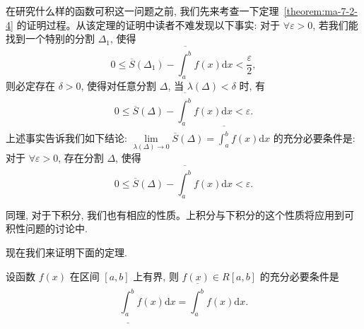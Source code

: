 在研究什么样的函数可积这一问题之前, 我们先来考查一下定理~\ref{theorem:ma-7-2-4} 的证明过程。从该定理的证明中读者不难发现以下事实: 对于 $\forall\varepsilon>0$, 若我们能找到一个特别的分割 $\Delta_1$, 使得
\[
  0\leq \overline S(\Delta_1)-\overline{\int_a^b} f(x)\mathrm dx<\frac{\varepsilon}{2},
\]
则必定存在 $\delta>0$, 使得对任意分割 $\Delta$, 当 $\lambda(\Delta)<\delta$ 时, 有
\[
  0\leq \overline S(\Delta)-\overline{\int_a^b} f(x)\mathrm dx<\varepsilon.
\]
上述事实告诉我们如下结论: $\lim\limits_{\lambda(\Delta)\to0}\overline S(\Delta)=\overline{\int_a^b} f(x)\mathrm dx$ 的充分必要条件是: 对于 $\forall\varepsilon>0$, 存在分割 $\Delta$, 使得
\[
  0\leq \overline S(\Delta)-\overline{\int_a^b} f(x)\mathrm dx<\varepsilon.
\]

同理, 对于下积分, 我们也有相应的性质。上积分与下积分的这个性质将应用到可积性问题的讨论中.

现在我们来证明下面的定理.

\begin{theorem}\label{theorem:ma-7-2-5}
设函数 $f(x)$ 在区间 $[a,b]$ 上有界, 则 $f(x)\in R[a,b]$ 的充分必要条件是
\[
  \underline{\int_a^b} f(x)\mathrm dx=\overline{\int_a^b} f(x)\mathrm dx.
\]
\end{theorem}


